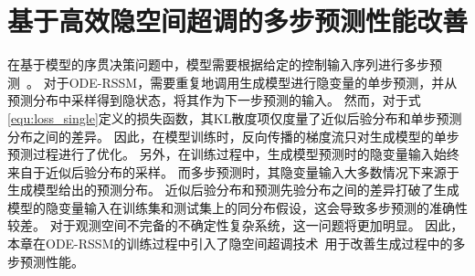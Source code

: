 \section{基于高效隐空间超调的多步预测性能改善}
\label{sec:5_overshooting}
在基于模型的序贯决策问题中，模型需要根据给定的控制输入序列进行多步预测~\cite{Hafner2019}。
对于ODE-RSSM，需要重复地调用生成模型进行隐变量的单步预测，并从预测分布中采样得到隐状态，将其作为下一步预测的输入。
然而，对于式\eqref{equ:loss_single}定义的损失函数，其KL散度项仅度量了近似后验分布和单步预测分布之间的差异。
因此，在模型训练时，反向传播的梯度流只对生成模型的单步预测过程进行了优化。
另外，在训练过程中，生成模型预测时的隐变量输入始终来自于近似后验分布的采样。
而多步预测时，其隐变量输入大多数情况下来源于生成模型给出的预测分布。
近似后验分布和预测先验分布之间的差异打破了生成模型的隐变量输入在训练集和测试集上的同分布假设，这会导致多步预测的准确性较差\cite{venkatraman2015improving}。
对于观测空间不完备的不确定性复杂系统，这一问题将更加明显。
因此，本章在ODE-RSSM的训练过程中引入了隐空间超调技术~\cite{Hafner2019}用于改善生成过程中的多步预测性能。

